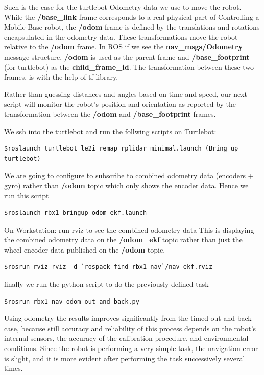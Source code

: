 \documentclass[10pt,a4paper]{article}
\begin{document}
Such is the case for the turtlebot Odometry data we use to move the robot.
While the \textbf{/base\_link} frame corresponds to a real physical part of Controlling a Mobile Base robot, the \textbf{/odom} frame is defined by the translations and rotations encapsulated in the odometry data. These transformations move the robot relative to the \textbf{/odom} frame.
In ROS if we see the \textbf{nav\_msgs/Odometry} message structure, \textbf{/odom }is used as the parent frame and \textbf{/base\_footprint} (for turtlebot) as the \textbf{child\_frame\_id}. The transformation between these two frames, is with the help of tf library.

Rather than guessing distances and angles based on time and speed, our next script will monitor the robot's position and orientation as reported by the transformation between the \textbf{/odom }and \textbf{/base\_footprint} frames.

We ssh into the turtlebot and run the follwing scripts
on Turtlebot:
\begin{lstlisting}[frame=single] 
$roslaunch turtlebot_le2i remap_rplidar_minimal.launch (Bring up turtlebot)
\end{lstlisting}
We are going to configure to subscribe to combined odometry data (encoders + gyro) 
rather than \textbf{/odom }topic which only shows the encoder data. Hence we run this script
\begin{lstlisting}[frame=single] 
$roslaunch rbx1_bringup odom_ekf.launch
\end{lstlisting}

On Workstation:
run rviz to see the combined odometry data
This is displaying the combined odometry data on the \textbf{/odom\_ekf} 
topic rather than just the wheel encoder data published on the \textbf{/odom} topic.
\begin{lstlisting}[frame=single] 
$rosrun rviz rviz -d `rospack find rbx1_nav`/nav_ekf.rviz
\end{lstlisting}

finally we run the python script to do the previously defined task 
\begin{lstlisting}[frame=single] 
$rosrun rbx1_nav odom_out_and_back.py
\end{lstlisting}

Using odometry the results improves significantly from the timed out-and-back case, because still accuracy and reliability of this process depends on the robot's internal sensors, the accuracy of the calibration procedure, and environmental conditions.
Since the robot is performing a very simple task, the navigation error is slight, and it is more evident after performing the task successively several times.
\end{document}
